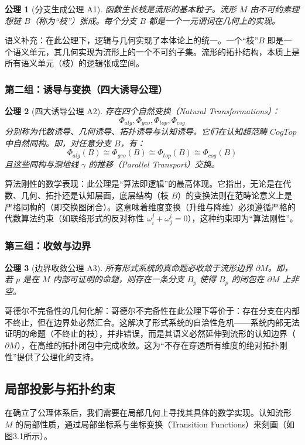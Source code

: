 \documentclass[11pt,a4paper]{article}
\newtheorem{axiom}{公理}
\begin{document}
\begin{axiom}[分支生成公理 A1]
函数生长枝是流形的基本粒子。流形 \(M\) 由不可约素理想链 \(B\)（称为“枝”）张成。每个分支 \(B\) 都是一个一元谓词在几何上的实现。
\end{axiom}

语义补充：在此公理下，逻辑与几何实现了本体论上的统一。一个“枝”\(B\) 即是一个语义单元，其几何实现为流形上的一个不可约子集。流形的拓扑结构，本质上是所有语义单元（枝）的逻辑张成空间。

\subsubsection{第二组：诱导与变换（四大诱导公理）}
\begin{axiom}[四大诱导公理 A2]
存在四个自然变换（Natural Transformations）：
\[
\Phi_{alg},\Phi_{geo},\Phi_{top},\Phi_{cog}
\]
分别称为代数诱导、几何诱导、拓扑诱导与认知诱导。它们在认知超范畴 \(CogTop\) 中自然同构。即，对任意分支 \(B\)，有：
\[
\Phi_{alg}(B)\cong \Phi_{geo}(B)\cong \Phi_{top}(B)\cong \Phi_{cog}(B)
\]
且这些同构与测地线 \(\gamma\) 的推移（Parallel Transport）交换。
\end{axiom}

算法刚性的数学表现：此公理是“算法即逻辑”的最高体现。它指出，无论是在代数、几何、拓扑还是认知层面，底层结构（枝 \(B\)）的变换法则在范畴论意义上是严格同构的（即交换图闭合）。这意味着维度变换（升维与降维）必须遵循严格的代数算法约束（如联络形式的反对称性 \(\omega_i^j+\omega_j^i=0\)），这种约束即为“算法刚性”。

\subsubsection{第三组：收敛与边界}
\begin{axiom}[边界收敛公理 A3]
所有形式系统的真命题必收敛于流形边界 \(\partial M\)。即，若 \(p\) 是在 \(M\) 内部可证明的命题，则存在一条分支 \(B_p\) 使得 \(B_p\) 的闭包在 \(\partial M\) 上非空。
\end{axiom}

哥德尔不完备性的几何化解：哥德尔不完备性在此公理下等价于：存在分支在内部不终止，但在边界处必然汇合。这解决了形式系统的自洽性危机——系统内部无法证明的命题（不终止的枝），并非错误，而是其语义必然延伸到流形的认知边界（\(\partial M\)），在高维的拓扑闭包中完成收敛。这为“不存在穿透所有维度的绝对拓扑刚性”提供了公理化的支持。

\subsection{局部投影与拓扑约束}
在确立了公理体系后，我们需要在局部几何上寻找其具体的数学实现。认知流形 \(M\) 的局部性质，通过局部坐标系与坐标变换（Transition Functions）来刻画（如图3.1所示）。
\end{document}
